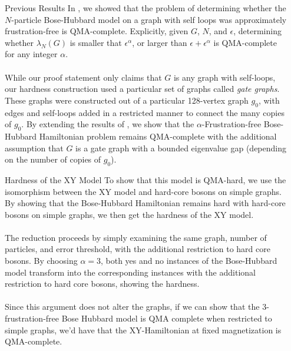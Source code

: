 \documentclass{beamer}
\newlength{\sepwid}
\newlength{\onecolwid}
\begin{document}
\begin{frame}[t]
\begin{columns}[t]
\begin{column}{\sepwid}\end{column}

\begin{column}{\onecolwid}
  \begin{block}{Previous Results}
    In \cite{BHQMA}, we showed that the problem of determining whether the $N$-particle Bose-Hubbard model on a graph with self loops was approximately frustration-free is QMA-complete.  Explicitly, given $G$, $N$, and $\epsilon$, determining whether $\lambda_N(G)$ is smaller that $\epsilon^\alpha$, or larger than $\epsilon + \epsilon^\alpha$ is QMA-complete for any integer $\alpha$.  
    \\~\\
    While our proof statement only claims that $G$ is any graph with self-loops, our hardness construction used a particular set of graphs called \textit{gate graphs}. These graphs were constructed out of a particular 128-vertex graph $g_0$, with edges and self-loops added in a restricted manner to connect the many copies of $g_0$.  By extending the results of \cite{BHQMA}, we show that the $\alpha$-Frustration-free Bose-Hubbard Hamiltonian problem remains QMA-complete with the additional assumption that $G$ is a gate graph with a bounded eigenvalue gap (depending on the number of copies of $g_0$).
  \end{block}
  
  \begin{block}{Hardness of the XY Model}
    To show that this model is QMA-hard, we use the isomorphism between the XY model and hard-core bosons on simple graphs. By showing that the Bose-Hubbard Hamiltonian remains hard with hard-core bosons on simple graphs, we then get the hardness of the XY model.
    \\~\\
    The reduction proceeds by simply examining the same graph, number of particles, and error threshold, with the additional restriction to hard core bosons.  By choosing $\alpha = 3$, both yes and no instances of the Bose-Hubbard model transform into the corresponding instances with the additional restriction to hard core bosons, showing the hardness.
    \\~\\
    Since this argument does not alter the graphs, if we can show that the $3$-frustration-free Bose Hubbard model is QMA complete when restricted to simple graphs, we'd have that the XY-Hamiltonian at fixed magnetization is QMA-complete.
  \end{block}
  

\end{column}
\end{columns}
\end{frame}
\end{document}
